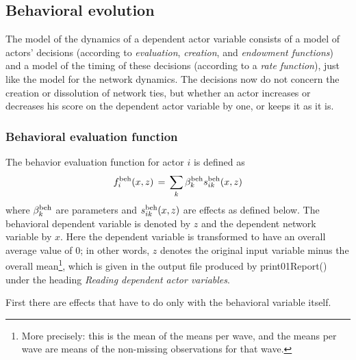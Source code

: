 \documentclass[a4paper,fleqn,11pt]{article}
\newcommand{\+}{\, + \,}
\newcommand{\sfn}[1]{\textsf{#1}}
\begin{document}
\subsection{Behavioral evolution}
\label{S_ff_b}

The model of the dynamics of a dependent actor variable
consists of a model of actors' decisions (according to {\it
evaluation}, {\it creation}, and {\it endowment functions})
and a model of the timing
of these decisions (according to a {\it rate function}),
just like the model for the network dynamics. The
decisions now do not concern the creation or dissolution of
network ties, but whether an actor increases or decreases his
score on the dependent actor variable by one, or keeps it as it
is.

\subsubsection{Behavioral evaluation function}
\label{S_f_b}

The behavior evaluation function for actor $i$ is defined as
\begin{equation}
f^{\rm beh}_i(x, z) \, = \, \sum_k \beta^{\rm beh}_k s^{\rm beh}_{ik}(x, z)
                                             \label{f_beh}
\end{equation}
where $\beta^{\rm beh}_k$ are parameters and $s^{\rm beh}_{ik}(x, z)$
are effects as defined below.
The behavioral dependent variable is denoted by $z$ and the
dependent network variable by $x$.
Here the dependent variable is transformed
to have an overall average value of 0;
in other words, $z$ denotes the original input variable
minus the overall mean\footnote{More precisely: \label{meandef}
this is the mean of the means per wave, and the
means per wave are means of the non-missing observations
for that wave.}, which is given in the
output file produced by \sfn{print01Report()} under the heading
\emph{Reading dependent actor variables}.

First there are effects that have to do only
with the behavioral variable itself.
\end{document}

